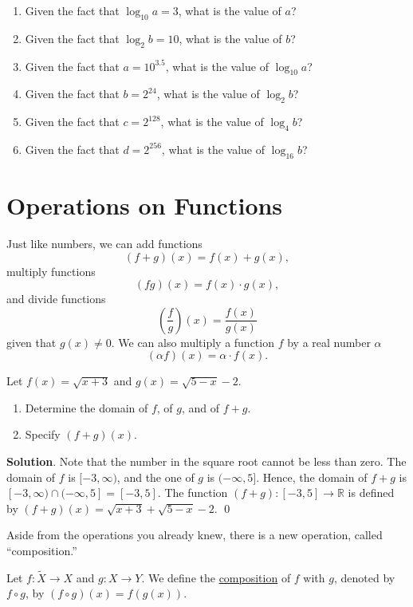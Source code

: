 \documentclass[11pt]{book}
\theoremstyle{break}
\theoremstyle{no_label}
\newcommand{\bbR}{\mathbb{R}}
\numberwithin{equation}{section}
\begin{document}
\begin{enumerate}[label=\arabic*.]
    \item Given the fact that $\log_{10}a=3$, what is the value of $a$?
    \item Given the fact that $\log_{2}b=10$, what is the value of $b$?
    \item Given the fact that $a=10^{3.5}$, what is the value of $\log_{10}a$?
    \item Given the fact that $b=2^{24}$, what is the value of $\log_{2}b$?
    \item Given the fact that $c=2^{128}$, what is the value of $\log_{4}b$?
    \item Given the fact that $d=2^{256}$, what is the value of $\log_{16}b$?
    
\end{enumerate}


\section{Operations on Functions}

\setlength{\delimitershortfall}{0pt}

Just like numbers, we can add functions $$(f+g)(x)=f(x)+g(x),$$ multiply functions $$(fg)(x)=f(x)\cdot g(x),$$ and divide functions $$\left(\dfrac{f}{g}\right)(x)=\dfrac{f(x)}{g(x)}$$ given that $g(x)\ne 0$. We can also multiply a function $f$ by a real number $\alpha$ $$(\alpha f)(x)=\alpha\cdot f(x).$$

\setlength{\delimitershortfall}{13.5pt}

\begin{example}
    Let $f(x)=\sqrt{x+3}$ and $g(x)=\sqrt{5-x}-2$.
    \begin{enumerate}
        \item Determine the domain of $f$, of $g$, and of $f+g$.
        \item Specify $(f+g)(x)$.
    \end{enumerate}
\end{example}
\textbf{Solution}. Note that the number in the square root cannot be less than zero. The domain of $f$ is $[-3, \infty)$, and the one of $g$ is $(-\infty, 5]$. Hence, the domain of $f+g$ is $[-3, \infty)\cap(-\infty, 5]=[-3, 5]$. The function $(f+g):[-3, 5]\to\bbR$ is defined by $(f+g)(x)=\sqrt{x+3}+\sqrt{5-x}-2$. \qed

Aside from the operations you already knew, there is a new operation, called ``composition.''

\begin{definition}[Composition]
    Let $f:\tilde{X}\to X$ and $g:X\to Y$. We define the \underline{composition} of $f$ with $g$, denoted by $f\circ g$, by $(f\circ g)(x)=f(g(x))$.
\end{definition}
\end{document}
